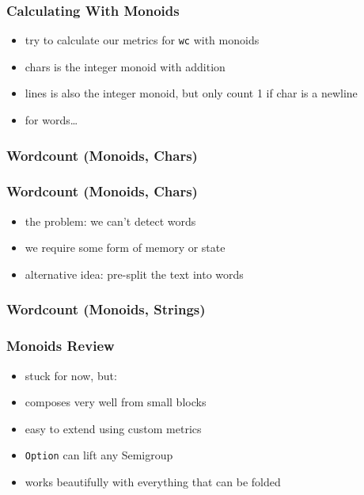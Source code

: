 \documentclass[aspectratio=169]{beamer}
\begin{document}
\begin{frame}
  \frametitle{Calculating With Monoids}
  \begin{itemize}
  \item try to calculate our metrics for \texttt{wc} with monoids
  \item chars is the integer monoid with addition
  \item lines is also the integer monoid, but only count 1 if char is a newline
  \item for words\ldots
  \end{itemize}
\end{frame}

\begin{frame}[fragile]
  \frametitle{Wordcount (Monoids, Chars)}
\end{frame}

\begin{frame}
  \frametitle{Wordcount (Monoids, Chars)}
  \begin{itemize}
  \item the problem: we can't detect words
  \item we require some form of memory or state
  \item alternative idea: pre-split the text into words
  \end{itemize}
\end{frame}

\begin{frame}[fragile]
  \frametitle{Wordcount (Monoids, Strings)}
\end{frame}

\begin{frame}
  \frametitle{Monoids \textemdash{} Review}
  \begin{itemize}
  \item stuck for now, but:
  \item composes very well from small blocks
  \item easy to extend using custom metrics
  \item \texttt{Option} can lift any Semigroup
  \item works beautifully with everything that can be folded
  \end{itemize}
  \vspace{1cm}
  \inputminted[fontsize=\small]{scala}{snippets/foldable-def.scala}
\end{frame}
\end{document}
